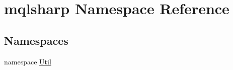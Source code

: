 \hypertarget{namespacemqlsharp}{}\section{mqlsharp Namespace Reference}
\label{namespacemqlsharp}
\subsection*{Namespaces}
\begin{DoxyCompactItemize}
\item 
namespace \hyperlink{namespacemqlsharp_1_1_util}{Util}
\end{DoxyCompactItemize}
